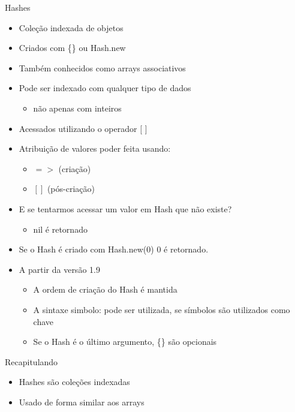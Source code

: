
\begin{frame}{Hashes}
  \begin{itemize}
    \item \alert{Coleção indexada} de objetos
    \item Criados com \{\} ou \alert{Hash.new}
    \item Também conhecidos como \alert{arrays associativos}
    \item Pode ser indexado com \alert{qualquer} tipo de dados
    \begin{itemize}
      \item não apenas com \alert{inteiros}
    \end{itemize}
    \item Acessados utilizando o operador \alert{[ ]}
    \item Atribuição de valores poder feita usando:
    \begin{itemize}
      \item \alert{$=>$} (criação)
      \item \alert{$[  ]$} (pós-criação)
    \end{itemize}
  \end{itemize}
  
  
\pagebreak
  \begin{itemize}
    \item E se tentarmos \alert{acessar} um valor em Hash que \alert{não existe}?
    \begin{itemize}
      \item \alert{nil} é retornado
    \end{itemize}
    \item Se o Hash é criado com \alert{Hash.new(0)} 0 é retornado.
  \end{itemize}  
  
  
  
\pagebreak
  \begin{itemize}
    \item A partir da versão 1.9
    \begin{itemize}
      \item A ordem de criação do Hash é \alert{mantida}
      \item A sintaxe \alert{simbolo:} pode ser utilizada, se símbolos são utilizados como chave
      \item Se o Hash é o \alert{último argumento}, \{\} são opcionais
    \end{itemize}
  \end{itemize}  
  
  

\end{frame}

\begin{frame}[fragile,t]{Recapitulando}
  \begin{itemize}
    \item Hashes são \alert{coleções indexadas}
    \item Usado de forma \alert{similar aos arrays}
  \end{itemize}
\end{frame}



